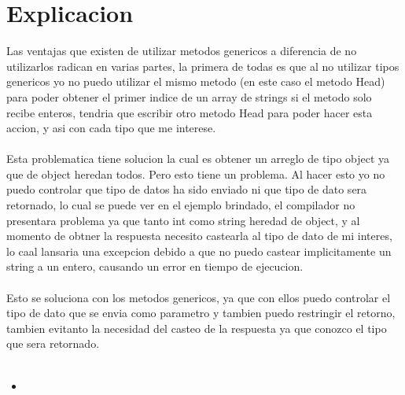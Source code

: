 \documentclass{article}
\title{Hoja de trabajo #4}
\author{Javier Jose Alvarez Flores, 20171074, alvarez171074@unis.edu.gt}
\date{25 de febrero del 2018}
\newcommand{\perlscript}[2]{
\begin{itemize}
\item[]
\end{itemize}
}
\begin{document}
\maketitle
\section{Explicacion}
Las ventajas que existen de utilizar metodos genericos a diferencia de no utilizarlos radican en varias partes, la primera de todas es que al no utilizar tipos genericos yo no puedo utilizar el mismo metodo (en este caso el metodo Head) para poder obtener el primer indice de un array de strings si el metodo solo recibe enteros, tendria que escribir otro metodo Head para poder hacer esta accion, y asi con cada tipo que me interese. 
\\\\
Esta problematica tiene solucion la cual es obtener un arreglo de tipo object ya que de object heredan todos. Pero esto tiene un problema. Al hacer esto yo no puedo controlar que tipo de datos ha sido enviado ni que tipo de dato sera retornado, lo cual se puede ver en el ejemplo brindado, el compilador no presentara problema ya que tanto int como string heredad de object, y al momento de obtner la respuesta necesito castearla al tipo de dato de mi interes, lo caal lansaria una excepcion debido a que no puedo castear implicitamente un string a un entero, causando un error en tiempo de ejecucion. 
\\\\
Esto se soluciona con los metodos genericos, ya que con ellos puedo controlar el tipo de dato que se envia como parametro y tambien puedo restringir el retorno, tambien evitanto la necesidad del casteo de la respuesta ya que conozco el tipo que sera retornado.
\\\\
\perlscript{ejemplo}{}
\end{document}
